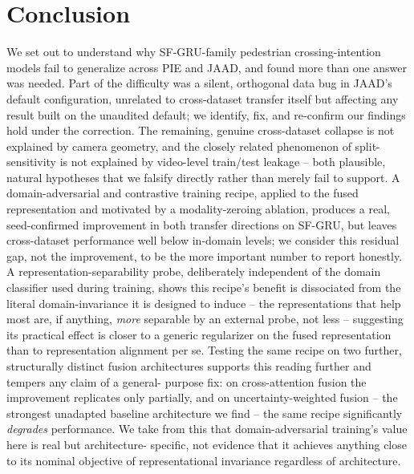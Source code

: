 
\section{Conclusion}
\label{sec:conclusion}

We set out to understand why SF-GRU-family pedestrian crossing-intention
models fail to generalize across PIE and JAAD, and found more than one
answer was needed. Part of the difficulty was a silent, orthogonal data
bug in JAAD's default configuration, unrelated to cross-dataset transfer
itself but affecting any result built on the unaudited default; we
identify, fix, and re-confirm our findings hold under the correction.
The remaining, genuine cross-dataset collapse is not explained by camera
geometry, and the closely related phenomenon of split-sensitivity is
not explained by video-level train/test leakage -- both plausible,
natural hypotheses that we falsify directly rather than merely fail to
support. A domain-adversarial and contrastive training recipe, applied
to the fused representation and motivated by a modality-zeroing
ablation, produces a real, seed-confirmed improvement in both transfer
directions on SF-GRU, but leaves cross-dataset performance well below
in-domain levels; we consider this residual gap, not the improvement,
to be the more important number to report honestly. A
representation-separability probe, deliberately independent of the
domain classifier used during training, shows this recipe's benefit is
dissociated from the literal domain-invariance it is designed to
induce -- the representations that help most are, if anything,
\emph{more} separable by an external probe, not less -- suggesting its
practical effect is closer to a generic regularizer on the fused
representation than to representation alignment per se. Testing the
same recipe on two further, structurally distinct fusion architectures
supports this reading further and tempers any claim of a general-
purpose fix: on cross-attention fusion the improvement replicates only
partially, and on uncertainty-weighted fusion -- the strongest
unadapted baseline architecture we find -- the same recipe
significantly \emph{degrades} performance. We take from this that
domain-adversarial training's value here is real but architecture-
specific, not evidence that it achieves anything close to its nominal
objective of representational invariance regardless of architecture.

